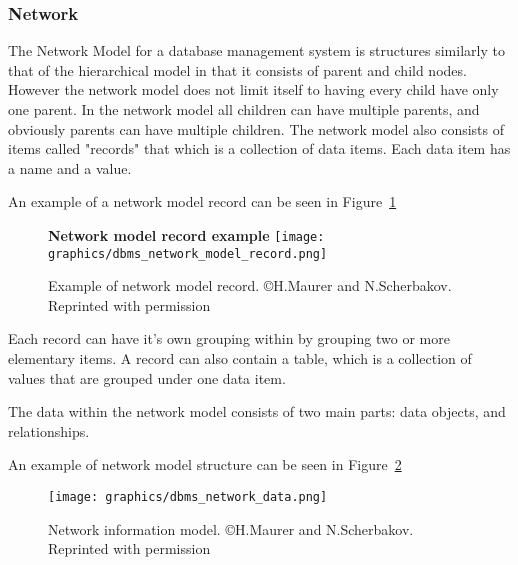 \documentclass[letterpaper, 11pt]{article}
\begin{document}
\subsubsection{Network}
The Network Model for a database management system is structures similarly to that of the
hierarchical model in that it consists of parent and child nodes. However the network
model does not limit itself to having every child have only one parent. In the network
model all children can have multiple parents, and obviously parents can have multiple
children. The network model also consists of items called "records" that which is a
collection of data items. Each data item has a name and a value.
\par\vspace{\baselineskip}
An example of a network model record can be seen in Figure~\ref{fig:networkDBMS_record}
\begin{figure}
  \centering
  \textbf{Network model record example}
  \texttt{[image: graphics/dbms\_network\_model\_record.png]}
  \caption{Example of network model record. \newline \copyright H.Maurer and N.Scherbakov. Reprinted with permission  \cite{network_model_coronet}}
  \label{fig:networkDBMS_record}
\end{figure}

Each record can have it's own grouping within by grouping two or more elementary items.
A record can also contain a table, which is a collection of values that are grouped
under one data item.
\par\vspace{\baselineskip}
The data within the network model consists of two main parts: data objects, and
relationships.
\par\vspace{\baselineskip}
An example of network model structure can be seen in Figure~\ref{fig:networkDBMS_structure}
\begin{figure}[H]
  \centering
  \texttt{[image: graphics/dbms\_network\_data.png]}
  \caption{Network information model. \newline \copyright H.Maurer and N.Scherbakov. Reprinted with permission \cite{network_model_coronet}}
  \label{fig:networkDBMS_structure}
\end{figure}
\end{document}
